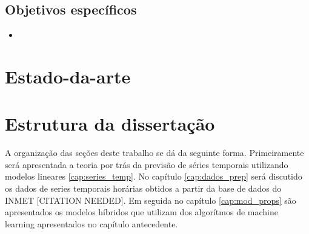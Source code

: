 \subsection{Objetivos específicos}

\begin{itemize}
    \item 
\end{itemize}

\section{Estado-da-arte}


\section{Estrutura da dissertação}

A organização das seções deste trabalho se dá da seguinte forma. Primeiramente será apresentada a teoria por trás da previsão de séries temporais utilizando modelos lineares \ref{cap:series_temp}. %
No capítulo \ref{cap:dados_prep} será discutido os dados de series temporais horárias obtidos a partir da base de dados do INMET [CITATION NEEDED]. Em seguida no capítulo \ref{cap:mod_props} são apresentados os modelos híbridos que utilizam dos algorítmos de machine learning apresentados no capítulo antecedente.